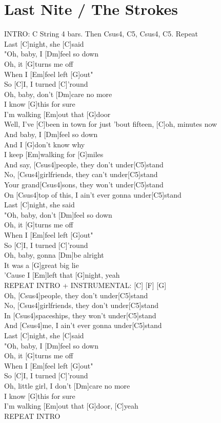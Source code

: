 \section{Last Nite / The Strokes}\label{sec:lastnite}
\CsusFour
\Cfive
\Cmajor
\Dminor
\Gmajor
\Eminor
\Fmajor

INTRO: C String 4 bars. Then Csus4, C5, Csus4, C5. Repeat\\
Last [C]night, she [C]said\\
"Oh, baby, I [Dm]feel so down\\
Oh, it [G]turns me off\\
When I [Em]feel left [G]out"\\
So [C]I, I turned [C]'round\\
Oh, baby, don't [Dm]care no more\\
I know [G]this for sure\\
I'm walking [Em]out that [G]door\\
Well, I've [C]been in town for just 'bout fifteen, [C]oh, minutes now\\
And baby, I [Dm]feel so down\\
And I [G]don't know why\\
I keep [Em]walking for [G]miles\\
And say, [Csus4]people, they don't under[C5]stand\\
No, [Csus4]girlfriends, they can't under[C5]stand\\
Your grand[Csus4]sons, they won't under[C5]stand\\
On [Csus4]top of this, I ain't ever gonna under[C5]stand\\
Last [C]night, she said\\
"Oh, baby, don't [Dm]feel so down\\
Oh, it [G]turns me off\\
When I [Em]feel left [G]out"\\
So [C]I, I turned [C]'round\\
Oh, baby, gonna [Dm]be alright\\
It was a [G]great big lie\\
'Cause I [Em]left that [G]night, yeah\\
REPEAT INTRO + INSTRUMENTAL: [C] [F] [G]\\
Oh, [Csus4]people, they don't under[C5]stand\\
No, [Csus4]girlfriends, they don't under[C5]stand\\
In [Csus4]spaceships, they won't under[C5]stand\\
And [Csus4]me, I ain't ever gonna under[C5]stand\\
Last [C]night, she [C]said\\
"Oh, baby, I [Dm]feel so down\\
Oh, it [G]turns me off\\
When I [Em]feel left [G]out"\\
So [C]I, I turned [C]'round\\
Oh, little girl, I don't [Dm]care no more\\
I know [G]this for sure\\
I'm walking [Em]out that [G]door, [C]yeah\\
REPEAT INTRO
